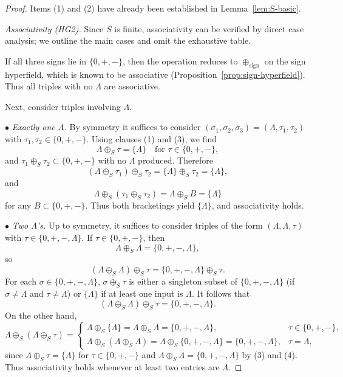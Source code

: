 \documentclass[11pt]{amsart}
\numberwithin{equation}{section}
\theoremstyle{definition}
\theoremstyle{remark}
\newcommand{\Sset}{S}                      %
\newcommand{\sop}{\oplus_S}                %
\begin{document}
\begin{proof}
Items (1) and (2) have already been established in
Lemma~\ref{lem:S-basic}.

\smallskip\noindent
\emph{Associativity (HG2).}  Since $\Sset$ is finite, associativity
can be verified by direct case analysis; we outline the main cases and
omit the exhaustive table.

If all three signs lie in $\{0,+,-\}$, then the operation reduces to
$\oplus_{\mathrm{sign}}$ on the sign hyperfield, which is known to be
associative (Proposition~\ref{prop:sign-hyperfield}).  Thus all
triples with no $\Lambda$ are associative.

Next, consider triples involving $\Lambda$.

\smallskip
\noindent
$\bullet$ \emph{Exactly one $\Lambda$.}  By symmetry it suffices to
consider $(\sigma_1,\sigma_2,\sigma_3)=(\Lambda,\tau_1,\tau_2)$ with
$\tau_1,\tau_2\in\{0,+,-\}$.  Using clauses (1) and (3), we find
\[
  \Lambda\sop\tau = \{\Lambda\}
  \quad\text{for }\tau\in\{0,+,-\},
\]
and $\tau_1\sop\tau_2\subset\{0,+,-\}$ with no $\Lambda$ produced.
Therefore
\[
  (\Lambda\sop\tau_1)\sop\tau_2
  = \{\Lambda\}\sop\tau_2
  = \{\Lambda\},
\]
and
\[
  \Lambda\sop(\tau_1\sop\tau_2)
  = \Lambda\sop B
  = \{\Lambda\}
\]
for any $B\subset\{0,+,-\}$.  Thus both bracketings yield
$\{\Lambda\}$, and associativity holds.

\smallskip
\noindent
$\bullet$ \emph{Two $\Lambda$'s.}  Up to symmetry, it suffices to
consider triples of the form $(\Lambda,\Lambda,\tau)$ with
$\tau\in\{0,+,-,\Lambda\}$.  If $\tau\in\{0,+,-\}$, then
\[
  \Lambda\sop\Lambda = \{0,+,-,\Lambda\},
\]
so
\[
  (\Lambda\sop\Lambda)\sop\tau
  = \{0,+,-,\Lambda\}\sop\tau.
\]
For each $\sigma\in\{0,+,-,\Lambda\}$, $\sigma\sop\tau$ is either a
singleton subset of $\{0,+,-,\Lambda\}$ (if $\sigma\ne\Lambda$ and
$\tau\ne\Lambda$) or $\{\Lambda\}$ if at least one input is
$\Lambda$.  It follows that
\[
  (\Lambda\sop\Lambda)\sop\tau
  = \{0,+,-,\Lambda\}.
\]
On the other hand,
\[
  \Lambda\sop(\Lambda\sop\tau)
  =
  \begin{cases}
    \Lambda\sop\{\Lambda\} = \Lambda\sop\Lambda
      = \{0,+,-,\Lambda\},
      & \tau\in\{0,+,-\},\\[2pt]
    \Lambda\sop(\Lambda\sop\Lambda)
      = \Lambda\sop\{0,+,-,\Lambda\}
      = \{0,+,-,\Lambda\},
      & \tau=\Lambda,
  \end{cases}
\]
since $\Lambda\sop\tau=\{\Lambda\}$ for $\tau\in\{0,+,-\}$ and
$\Lambda\sop\Lambda=\{0,+,-,\Lambda\}$ by (3) and (4).  Thus
associativity holds whenever at least two entries are $\Lambda$.


\end{proof}
\end{document}
